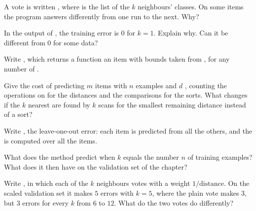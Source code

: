 \begin{exercise}[$\star\star$]\label{exo:g11:k-nearest-neighbours:9}
A vote is written , where  is the list of the $k$ neighbours'
classes. On some items the program answers differently from one run to the next. Why?
\end{exercise}

\begin{exercise}[$\star\star$]\label{exo:g11:k-nearest-neighbours:10}
In the output of , the training error is $0$ for $k = 1$. Explain why. Can it be different from
$0$ for some data?
\end{exercise}

\begin{exercise}[$\star\star$]\label{exo:g11:k-nearest-neighbours:11}
Write , which returns a function  an item with bounds taken from , for any
number of .
\end{exercise}

\begin{exercise}[$\star\star\star$]\label{exo:g11:k-nearest-neighbours:12}
Give the cost of predicting $m$ items with $n$ examples and $d$ , counting the operations on  for the
distances and the comparisons for the sorts. What changes if the $k$ nearest are found by $k$ scans for the smallest
remaining distance instead of a sort?
\end{exercise}

\begin{exercise}[$\star\star\star$]\label{exo:g11:k-nearest-neighbours:13}
Write , the leave-one-out error: each item is predicted from all the others, and the  is computed over all the items.
\end{exercise}

\begin{exercise}[$\star\star\star$]\label{exo:g11:k-nearest-neighbours:14}
What does the method predict when $k$ equals the number $n$ of training examples? What  does it then have on
the validation set of the chapter?
\end{exercise}

\begin{exercise}[$\star\star\star$]\label{exo:g11:k-nearest-neighbours:15}
Write , in which each of the $k$ neighbours votes with a weight $1/\text{distance}$.
On the scaled validation set it makes $5$ errors with $k = 5$, where the plain vote makes $3$, but $3$ errors for
every $k$ from $6$ to $12$. What do the two votes do differently?
\end{exercise}

